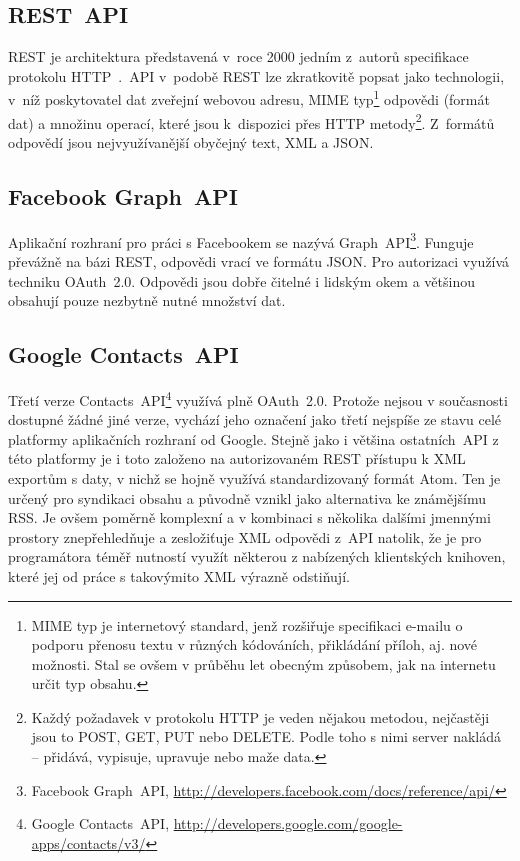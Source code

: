 \documentclass[12pt,oneside,final]{fithesis2}
\begin{document}
\subsection{REST~API}
REST je architektura představená v~roce 2000 jedním z~autorů specifikace protokolu HTTP~\cite{fielding2000architectural}.~API v~podobě REST lze zkratkovitě popsat jako technologii, v~níž poskytovatel dat zveřejní webovou adresu, MIME typ\footnote{MIME typ je internetový standard, jenž rozšiřuje specifikaci e-mailu o podporu přenosu textu v různých kódováních, přikládání příloh, aj. nové možnosti. Stal se ovšem v průběhu let obecným způsobem, jak na internetu určit typ obsahu.} odpovědi (formát dat) a množinu operací, které jsou k~dispozici přes HTTP metody\footnote{Každý požadavek v protokolu HTTP je veden nějakou metodou, nejčastěji jsou to POST, GET, PUT nebo DELETE. Podle toho s nimi server nakládá -- přidává, vypisuje, upravuje nebo maže data.}. Z~formátů odpovědí jsou nej\-využívanější obyčejný text, XML a JSON.

\subsection{Facebook Graph~API}
Aplikační rozhraní pro práci s Facebookem se nazývá Graph~API\footnote{Facebook Graph~API, \url{http://developers.facebook.com/docs/reference/api/}}. Funguje převážně na bázi REST, odpovědi vrací ve formátu JSON. Pro autorizaci využívá techniku OAuth~2.0. Odpovědi jsou dobře čitelné i lidským okem a většinou obsahují pouze nezbytně nutné množství dat.

\subsection{Google Contacts~API}
Třetí verze Contacts~API\footnote{Google Contacts~API, \url{http://developers.google.com/google-apps/contacts/v3/}} využívá plně OAuth~2.0. Protože nejsou v současnosti dostupné žádné jiné verze, vychází jeho označení jako třetí nejspíše ze stavu celé platformy aplikačních rozhraní od Google. Stejně jako i většina ostatních~API z této platformy je i toto založeno na autorizovaném REST přístupu k XML exportům s daty, v nichž se hojně využívá standardizovaný formát Atom. Ten je určený pro syndikaci obsahu a původně vznikl jako alternativa ke známějšímu RSS. Je ovšem poměrně komplexní a v kombinaci s několika dalšími jmennými prostory znepřehledňuje a zesložiťuje XML odpovědi z~API natolik, že je pro programátora téměř nutností využít některou z nabízených klientských knihoven, které jej od práce s takovýmito XML výrazně odstiňují.
\end{document}
